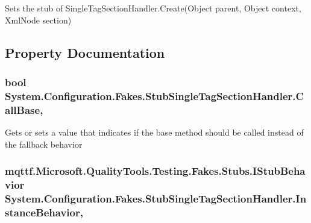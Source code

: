 Sets the stub of Single\-Tag\-Section\-Handler.\-Create(\-Object parent, Object context, Xml\-Node section)



\subsection{Property Documentation}
\hypertarget{class_system_1_1_configuration_1_1_fakes_1_1_stub_single_tag_section_handler_a41218af82f1b8b7d8a9bf83527519507}{
\subsubsection[{Call\-Base}]{\setlength{\rightskip}{0pt plus 5cm}bool System.\-Configuration.\-Fakes.\-Stub\-Single\-Tag\-Section\-Handler.\-Call\-Base\hspace{0.3cm}{\ttfamily [get]}, {\ttfamily [set]}}}\label{class_system_1_1_configuration_1_1_fakes_1_1_stub_single_tag_section_handler_a41218af82f1b8b7d8a9bf83527519507}


Gets or sets a value that indicates if the base method should be called instead of the fallback behavior

\hypertarget{class_system_1_1_configuration_1_1_fakes_1_1_stub_single_tag_section_handler_a4f18ac272bb2e558febd0ed167ea6829}{
\subsubsection[{Instance\-Behavior}]{\setlength{\rightskip}{0pt plus 5cm}mqttf.\-Microsoft.\-Quality\-Tools.\-Testing.\-Fakes.\-Stubs.\-I\-Stub\-Behavior System.\-Configuration.\-Fakes.\-Stub\-Single\-Tag\-Section\-Handler.\-Instance\-Behavior\hspace{0.3cm}{\ttfamily [get]}, {\ttfamily [set]}}}\label{class_system_1_1_configuration_1_1_fakes_1_1_stub_single_tag_section_handler_a4f18ac272bb2e558febd0ed167ea6829}


